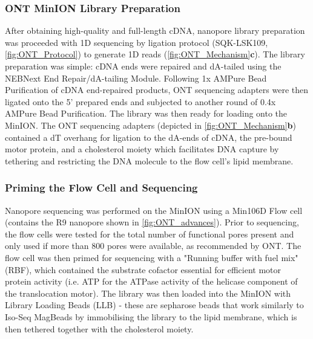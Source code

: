 \subsubsection{ONT MinION Library Preparation}
\label{sec: ONTlib_preparation}
After obtaining high-quality and full-length cDNA, nanopore library preparation was proceeded with 1D sequencing by ligation protocol (SQK-LSK109, \cref{fig:ONT_Protocol}) to generate 1D reads (\cref{fig:ONT_Mechanism}\textbf{c}). The library preparation was simple: cDNA ends were repaired and dA-tailed using the NEBNext End Repair/dA-tailing Module. Following 1x AMPure Bead Purification of cDNA end-repaired products, ONT sequencing adapters were then ligated onto the 5' prepared ends and subjected to another round of 0.4x AMPure Bead Purification. The library was then ready for loading onto the MinION. The ONT sequencing adapters (depicted in \cref{fig:ONT_Mechanism}\textbf{b}) contained a dT overhang for ligation to the dA-ends of cDNA, the pre-bound motor protein, and a cholesterol moiety which facilitates DNA capture by tethering and restricting the DNA molecule to the flow cell's lipid membrane.

\subsubsection{Priming the Flow Cell and Sequencing}
\label{sec: ONTlib_sequencing}
Nanopore sequencing was performed on the MinION using a Min106D Flow cell (contains the R9 nanopore shown in \cref{fig:ONT_advances}). Prior to sequencing, the flow cells were tested for the total number of functional pores present and only used if more than 800 pores were available, as recommended by ONT. The flow cell was then primed for sequencing with a "Running buffer with fuel mix" (RBF), which contained the substrate cofactor essential for efficient motor protein activity (i.e. ATP for the ATPase activity of the helicase component of the translocation motor). The library was then loaded into the MinION with Library Loading Beads (LLB) - these are sepharose beads that work similarly to Iso-Seq MagBeads by immobilising the library to the lipid membrane, which is then tethered together with the cholesterol moiety.    

